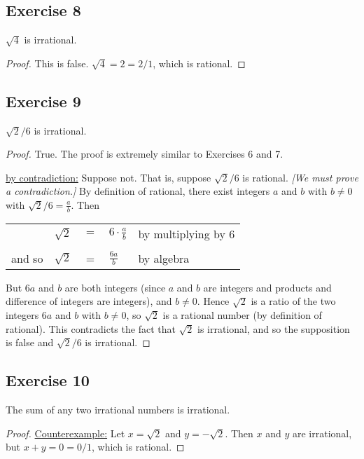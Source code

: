 \documentclass[14pt]{extarticle}
\newcommand{\dps}{\displaystyle}
\newcommand{\cy}{\color{cyan}}
\begin{document}
\subsection{Exercise 8}
$\sqrt{4}$ is irrational.

\begin{proof}
This is false. $\sqrt{4} = 2 = 2/1$, which is rational.
\end{proof}

\subsection{Exercise 9}
$\sqrt{2}/6$ is irrational.

\begin{proof}
True. The proof is extremely similar to Exercises 6 and 7. 

\underline{by contradiction:} Suppose not. That is, suppose
$\sqrt{2}/6$ is rational. {\it [We must prove a contradiction.]} By definition of rational, there exist integers $a$ and $b$ with $b \neq 0$ with $\sqrt{2}/6 = \frac{a}{b}$. Then

\begin{center}
\begin{tabular}{lrcll}
& $\sqrt{2}$ & $=$ & $\dps 6 \cdot\frac{a}{b}$ & {\cy by multiplying by 6} \\
\\
and so & $\sqrt{2}$ & = & $\dps\frac{6a}{b}$ & {\cy by algebra}\\
\end{tabular}
\end{center}

But $6a$ and $b$ are both integers (since $a$ and $b$ are integers and products and difference of integers are integers), and $b \neq 0$. Hence $\sqrt{2}$ is a ratio of the two integers $6a$ and $b$ with $b \neq 0$, so $\sqrt{2}$ is a rational number (by definition of rational). This contradicts the fact that $\sqrt{2}$ is irrational, and so the supposition is false and $\sqrt{2}/6$ is irrational.
\end{proof}

\subsection{Exercise 10}
The sum of any two irrational numbers is irrational.

\begin{proof}
\underline{Counterexample:} Let $x = \sqrt{2}$ and $y = -\sqrt{2}$. Then $x$ and $y$ are irrational, but $x + y = 0  = 0/1$, which is rational.
\end{proof}
\end{document}
